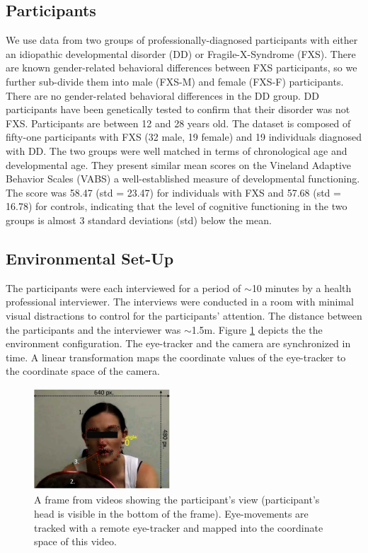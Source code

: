 \documentclass[10pt,twocolumn,letterpaper]{article}
\begin{document}
\subsection{Participants}
We use data from two groups of professionally-diagnosed participants with either an idiopathic developmental disorder (DD) or Fragile-X-Syndrome (FXS). There are known gender-related behavioral differences between FXS participants, so we further sub-divide them into male (FXS-M) and female (FXS-F) participants. There are no gender-related behavioral differences in the DD group. DD participants have been genetically tested to confirm that their disorder was not FXS. Participants are between 12 and 28 years old. The dataset is composed of fifty-one participants with FXS (32 male, 19 female) and 19 individuals diagnosed with DD. The two groups were well matched in terms of chronological age and developmental age. They present similar mean scores on the Vineland Adaptive Behavior Scales (VABS) a well-established measure of developmental functioning. The score was 58.47 (std = 23.47) for individuals with FXS and 57.68 (std = 16.78) for controls, indicating that the level of cognitive functioning in the two groups is almost 3 standard deviations (std) below the mean.


\subsection {Environmental Set-Up}
The participants were each interviewed for a period of $\sim$10 minutes by a health professional interviewer. The interviews were conducted in a room with minimal visual distractions to control for the participants' attention. The distance between the participants and the interviewer was $\sim$1.5m. Figure \ref{fig:environment} depicts the the environment configuration. The eye-tracker and the camera are synchronized in time. A linear transformation maps the coordinate values of the eye-tracker to the coordinate space of the camera.  

\begin{figure}[ht]   
 \centering
           \includegraphics[width=2in,height= 1.5in]{figures/Real.png}
 \caption{A frame from videos showing the participant's view (participant's head is visible in the bottom of the frame). Eye-movements are tracked with a remote eye-tracker and mapped into the coordinate space of this video.}
\label{fig:environment}
\end{figure}
\end{document}
